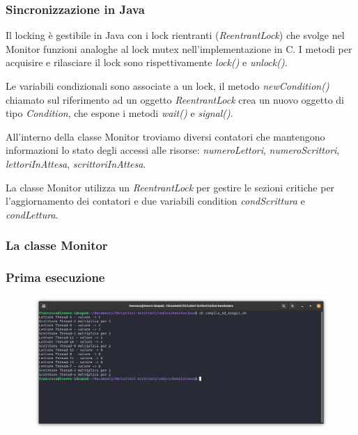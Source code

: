 \documentclass[10pt]{beamer}
\begin{document}
\begin{frame}
	\frametitle{Sincronizzazione in Java}
	Il locking è gestibile in Java con i lock rientranti (\emph{ReentrantLock}) che svolge nel Monitor funzioni analoghe al lock mutex nell'implementazione in C. I metodi per acquisire e rilasciare il lock sono rispettivamente \emph{lock()} e \emph{unlock()}.
	
	Le variabili condizionali sono associate a un lock, il metodo \emph{newCondition()} chiamato sul riferimento ad un oggetto \emph{ReentrantLock} crea un nuovo oggetto di tipo \emph{Condition}, che espone i metodi \emph{wait()} e \emph{signal()}.
	
	All'interno della classe Monitor troviamo diversi contatori che mantengono informazioni lo stato degli accessi alle risorse: \emph{numeroLettori}, \emph{numeroScrittori}, \emph{lettoriInAttesa}, \emph{scrittoriInAttesa}.
	
	La classe Monitor utilizza un \emph{ReentrantLock} per gestire le sezioni critiche per l'aggiornamento dei contatori e due variabili condition \emph{condScrittura} e \emph{condLettura}.
\end{frame}
\begin{frame}
	\frametitle{La classe Monitor}
	
\end{frame}

	\begin{frame}[fragile]
		\frametitle{Prima esecuzione}
		\begin{figure}
			\centering
			\includegraphics[width=1.03\linewidth]{img/esecuzione/programJ1}
			\label{fig:programc1}
		\end{figure}
	\end{frame}
\end{document}

